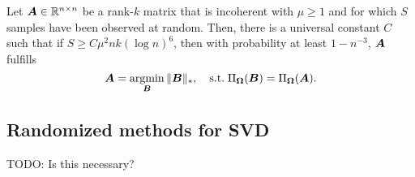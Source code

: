 \begin{theorem}
    Let $\bm{A} \in \mathbb{R}^{n \times n}$ be a rank-$k$ matrix that is incoherent with $\mu \geq 1$ and
    for which $S$ samples have been observed at random. Then, there is a universal constant $C$ such
    that if $S \geq C \mu^2 nk (\log n)^6$, then with probability at least $1 - n^{-3}$, $\bm{A}$
    fulfills \[
        \bm{A} = \operatorname*{argmin}_{\bm{B}} \| \bm{B} \|_*, \quad \mathrm{s.t.}\; \Pi_{\bm{\Omega}}(\bm{B}) = \Pi_{\bm{\Omega}}(\bm{A}).
    \]
\end{theorem}

\subsection{Randomized methods for SVD}

TODO: Is this necessary?
